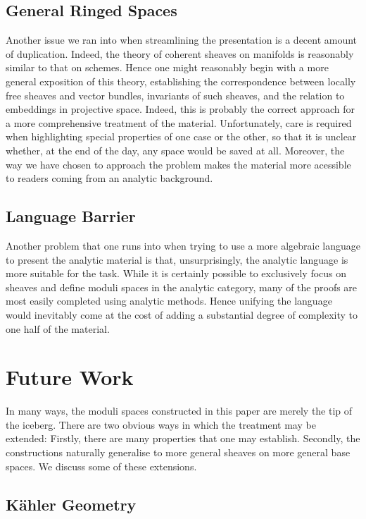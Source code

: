 \documentclass[12pt]{ociamthesis}  %
\begin{document}
\subsection{General Ringed Spaces}

Another issue we ran into when streamlining the presentation is
a decent amount of duplication. Indeed, the theory of coherent sheaves
on manifolds is reasonably similar to that on schemes. Hence
one might reasonably begin with a more general exposition of this
theory, establishing the correspondence between locally free sheaves
and vector bundles, invariants of such sheaves, and the relation to
embeddings in projective space. Indeed, this is probably the correct
approach for a more comprehensive treatment of the material.
Unfortunately, care is required when highlighting special properties
of one case or the other, so that it is unclear whether, at the end
of the day, any space would be saved at all. Moreover, the way we
have chosen to approach the problem makes the material more
acessible to readers coming from an analytic background.

\subsection{Language Barrier}

Another problem that one runs into when trying to use a more
algebraic language to present the analytic material is that,
unsurprisingly, the analytic language is more suitable for the
task. While it is certainly possible to exclusively focus on
sheaves and define moduli spaces in the analytic category, many
of the proofs are most easily completed using analytic methods.
Hence unifying the language would inevitably come at the cost
of adding a substantial degree of complexity to one half of the
material.

\section{Future Work}

In many ways, the moduli spaces constructed in this paper are
merely the tip of the iceberg. There are two obvious ways in which
the treatment may be extended: Firstly, there are many properties
that one may establish. Secondly, the constructions naturally generalise
to more general sheaves on more general base spaces. We discuss
some of these extensions.

\subsection{K\"ahler Geometry}
\end{document}
